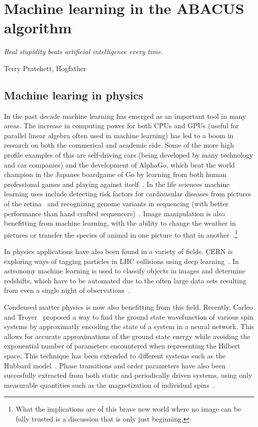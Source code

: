 \documentclass[11pt, a4paper]{report} %
\begin{document}
\chapter{Machine learning in the ABACUS algorithm}\label{chap:machine_learning}

\epigraph{\textit{Real stupidity beats artificial intelligence every time.}}{Terry Pratchett, Hogfather}

\section{Machine learing in physics}

In the past decade machine learning has emerged as an important tool in many areas.
The increase in computing power for both CPUs and GPUs (useful for parallel linear algebra often used in machine learning) has led to a boom in research on both the commerical and academic side.
Some of the more high profile examples of this are self-driving cars (being developed by many technology and car companies)  and the development of AlphaGo, which beat the world champion in the Japanes boardgame of Go by learning from both human professional games and playing against itself~\cite{Silver2017a,Silver2017}.
In the life sciences machine learning uses include detecting risk factors for cardivasular diseases from pictures of the retina~\cite{poplin17_predic_cardiov_risk_factor_from} and recognizing genome variants in sequencing (with better performance than hand crafted sequencers)~\cite{Poplin2016}.
Image manipulation is also benefitting from machine learning, with the ability to change the weather in pictures or transfer the species of animal in one picture to that in another~\cite{Liu2017}.\footnote{What the implications are of this brave new world where no image can be fully trusted is a discussion that is only just beginning.}

In physics applications have also been found in a variety of fields.
CERN is exploring ways of tagging particles in LHC collisions using deep learning~\cite{paganini17_machin_learn_algor_jet_taggin}.
In astronomy machine learning is used to classify objects in images and determine redshifts, which have to be automated due to the often large data sets resulting from even a single night of observations~\cite{ball10_data_minin_and_machin_learn_in_astron}.

Condensed matter physics is now also benefitting from this field.
Recently, Carleo and Troyer~\cite{Carleo2017} proposed a way to find the ground state wavefunction of various spin systems by approximatly encoding the state of a system in a neural network. This allows for accurate approximations of the ground state energy while avoiding the exponential number of parameters encountered when representing the Hilbert space.
This technique has been extended to different systems such as the Hubbard model~\cite{Saito2017}.
Phase transitions and order parameters have also been succesfully extracted from both static and periodically driven systems, using only measurable quantities such as the magnetization of individual spins~\cite{Nieuwenburg2017}.
\end{document}
